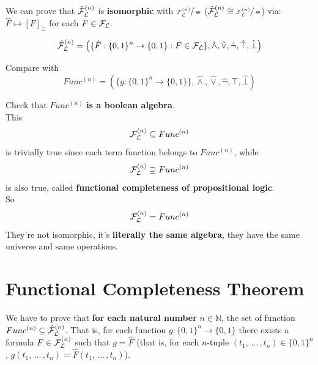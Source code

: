 	We can prove that $\hat{\mathcal{F}}_\mathcal{L}^{(n)}$ is \textbf{isomorphic} with $\sfrac{\mathcal{F}_\mathcal{L}^{(n)}}{\equiv}$ ($\hat{\mathcal{F}}_\mathcal{L}^{(n)} \cong \sfrac{\mathcal{F}_\mathcal{L}^{(n)}}{\equiv}$) via: $\hat F \mapsto [F]_\equiv$ for each $F \in \mathcal{F}_\mathcal{L}$.

	$$\hat{\mathcal{F}}_\mathcal{L}^{(n)} = \left(\{ \hat F: \{0,1\}^n \rightarrow \{0,1\}: F \in \mathcal{F}_\mathcal{L}\}, \hat \wedge, \hat \vee, \hat \neg, \hat \top, \hat \bot \right)$$

	\noindent
	Compare with
	$$ Func^{(n)} = \left(\{ g: \{0,1\}^n \rightarrow \{0,1\} \}, \hat \wedge, \hat \vee, \hat \neg, \hat \top, \hat \bot \right)$$

	\noindent
	Check that $Func^{(n)}$ \textbf{is a boolean algebra}.\\

	\noindent
	This
	$$ \mathcal{F}_\mathcal{L}^{(n)} \subseteq Func^{(n)}$$
	is trivially true since each term function belongs to $Func^{(n)}$, while
	$$ \mathcal{F}_\mathcal{L}^{(n)} \supseteq Func^{(n)}$$
	is also true, called \textbf{functional completeness of propositional logic}.\\

	\noindent
	So
	$$ \mathcal{F}_\mathcal{L}^{(n)} = Func^{(n)} $$
	They're not isomorphic, it's \textbf{literally the same algebra}, they have the same universe and same operations.

	\section{Functional Completeness Theorem}

	\begin{theorem}
	We have to prove that \textbf{for each natural number} $n \in \mathbb{N}$, the set of function $Func^{(n)} \subseteq \hat{\mathcal{F}}_\mathcal{L}^{(n)}$. That is, for each function $g: \{0,1\}^n \rightarrow \{0,1\}$ there exists a formula $F \in \mathcal{F}_\mathcal{L}^{(n)}$ such that  $g = \hat F$ (that is, for each $n$-tuple $(t_1, \, ... \, , t_n) \in \{0,1\}^n$, $g (t_1, \, ... \, , t_n) = \hat F (t_1, \, ... \, , t_n)$).
	\end{theorem}

